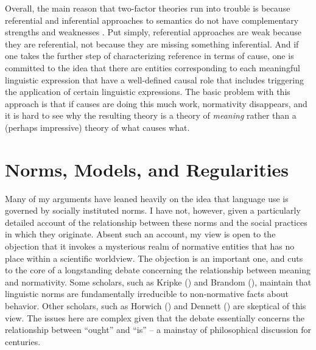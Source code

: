 Overall, the main reason that two-factor theories run into trouble is because referential and inferential approaches to semantics do not have complementary strengths and weaknesses \citep[c.f.,][]{Eliasmith:2000}. Put simply, referential approaches are weak because they are referential, not because they are missing something inferential. And if one takes the further step of characterizing reference in terms of cause, one is committed to the idea that there are entities corresponding to each meaningful linguistic expression that have a well-defined causal role that includes triggering the application of certain linguistic expressions. The basic problem with this approach is that if causes are doing this much work, normativity disappears, and it is hard to see why the resulting theory is a theory of \textit{meaning} rather than a (perhaps impressive) theory of what causes what.

\section{Norms, Models, and Regularities}

Many of my arguments have leaned heavily on the idea that language use is governed by socially instituted norms. I have not, however, given a particularly detailed account of the relationship between these norms and the social practices in which they originate. Absent such an account, my view is open to the objection that it invokes a mysterious realm of normative entities that has no place within a scientific worldview. The objection is an important one, and cuts to the core of a longstanding debate concerning the relationship between meaning and normativity. Some scholars, such as Kripke (\citeyear{Kripke:1982}) and Brandom (\citeyear{Brandom:1994}), maintain that linguistic norms are fundamentally irreducible to non-normative facts about behavior. Other scholars, such as Horwich (\citeyear{Horwich:2005}) and Dennett (\citeyear{Dennett:2010,Dennett:1987}) are skeptical of this view. The issues here are complex given that the debate essentially concerns the relationship between ``ought'' and ``is'' -- a mainstay of philosophical discussion for centuries. 

